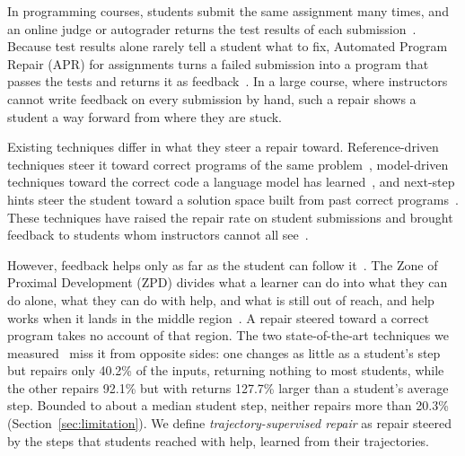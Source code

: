 \documentclass[10pt,conference]{IEEEtran}
\begin{document}
In programming courses, students submit the same assignment many times, and an online judge or autograder returns the test results of each submission~\cite{keuning2018systematic}. Because test results alone rarely tell a student what to fix, Automated Program Repair (APR) for assignments turns a failed submission into a program that passes the tests and returns it as feedback~\cite{gazzola2017automatic,monperrus2018automatic,joshi2023repair,zhang2024pydex}. In a large course, where instructors cannot write feedback on every submission by hand, such a repair shows a student a way forward from where they are stuck.

Existing techniques differ in what they steer a repair toward. Reference-driven techniques steer it toward correct programs of the same problem~\cite{gulwani2018automated,hu2019re,choi2025automated}, model-driven techniques toward the correct code a language model has learned~\cite{joshi2023repair,zhang2024pydex,dai2026learner}, and next-step hints steer the student toward a solution space built from past correct programs~\cite{rivers2017data,price2017isnap,roest2024next}. These techniques have raised the repair rate on student submissions and brought feedback to students whom instructors cannot all see~\cite{koutcheme2024benchmarking}.

However, feedback helps only as far as the student can follow it~\cite{narciss2008feedback,aleven2000limitations}. The Zone of Proximal Development (ZPD) divides what a learner can do into what they can do alone, what they can do with help, and what is still out of reach, and help works when it lands in the middle region~\cite{vygotsky1978mind}. A repair steered toward a correct program takes no account of that region. The two state-of-the-art techniques we measured~\cite{choi2025automated,dai2026learner} miss it from opposite sides: one changes as little as a student's step but repairs only 40.2\% of the inputs, returning nothing to most students, while the other repairs 92.1\% but with returns 127.7\% larger than a student's average step. Bounded to about a median student step, neither repairs more than 20.3\% (Section~\ref{sec:limitation}). We define \emph{trajectory-supervised repair} as repair steered by the steps that students reached with help, learned from their trajectories.
\end{document}
